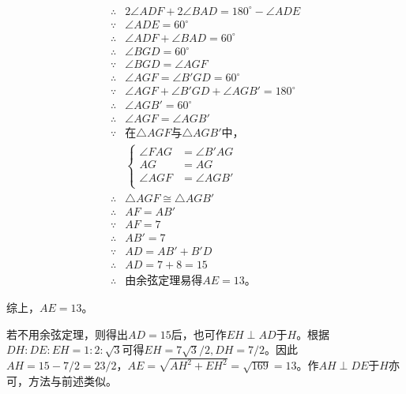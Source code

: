 \begin{align*}
  \therefore{}& 2\angle ADF + 2\angle BAD = 180^\circ - \angle ADE \\
  \because  {}& \angle ADE = 60^\circ \\
  \therefore{}& \angle ADF + \angle BAD = 60^\circ \\
  \therefore{}& \angle BGD = 60^\circ \\
  \because  {}& \angle BGD = \angle AGF \\
  \therefore{}& \angle AGF = \angle B'GD = 60^\circ \\
  \because  {}& \angle AGF + \angle B'GD + \angle AGB' = 180^\circ \\
  \therefore{}& \angle AGB' = 60^\circ \\
  \therefore{}& \angle AGF = \angle AGB' \\
  \because  {}& \text{在$\triangle AGF$与$\triangle AGB'$中，} \\
  &\left\{ \begin{aligned}
    \angle FAG &= \angle B'AG \\ AG &= AG \\ \angle AGF &= \angle AGB' \\
  \end{aligned} \right. \\
  \therefore{}& \triangle AGF \cong \triangle AGB' \\
  \therefore{}& AF = AB' \\
  \because  {}& AF = 7 \\
  \therefore{}& AB' = 7 \\
  \because  {}& AD = AB' + B'D \\
  \therefore{}& AD = 7 + 8 = 15 \\
  \therefore{}& \text{由余弦定理易得$AE = 13$。}
\end{align*}

综上，$AE = 13$。

若不用余弦定理，则得出$AD = 15$后，也可作$EH \perp AD$于$H$。根据$DH:DE:EH = 1:2:\sqrt3$可得$EH = 7\sqrt3/2, DH = 7/2$。因此$AH = 15 - 7/2 = 23/2$，$AE = \sqrt{AH^2 + EH^2} = \sqrt{169} = 13$。作$AH \perp DE$于$H$亦可，方法与前述类似。
